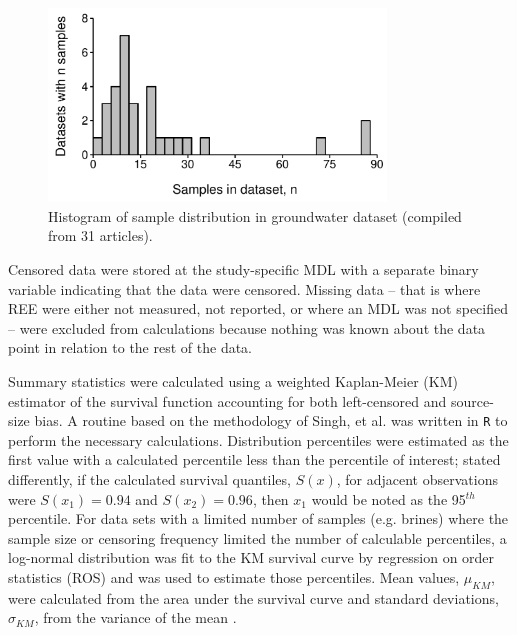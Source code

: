 \begin{figure}[htbp]
\begin{center}
\includegraphics[width=0.8\textwidth]{Ch3_figures/cite-n-dist.pdf}
\caption{Histogram of sample distribution in groundwater dataset (compiled from 31 articles).}\label{fig:sample_dist}
\end{center}
\end{figure}

Censored data were stored at the study-specific MDL with a separate binary variable indicating that the data were censored. Missing data -- that is where REE were either not measured, not reported, or where an MDL was not specified -- were excluded from calculations because nothing was known about the data point in relation to the rest of the data.

Summary statistics were calculated using a weighted Kaplan-Meier (KM) estimator of the survival function accounting for both left-censored and source-size bias.
A routine based on the methodology of Singh, et al. \citep{Singh_JAWMA_2013} was written in \texttt{R} \citep{R} to perform the necessary calculations.
Distribution percentiles were estimated as the first value with a calculated percentile less than the percentile of interest;
stated differently, if the calculated survival quantiles, $S(x)$, for adjacent observations were $S(x_1)=0.94$ and $S(x_2)=0.96$, then $x_1$ would be noted as the 95$^{th}$ percentile.
For data sets with a limited number of samples (e.g. brines) where the sample size or censoring frequency limited the number of calculable percentiles, a log-normal distribution was fit to the KM survival curve by regression on order statistics (ROS) and was used to estimate those percentiles.
Mean values, $\mu_{KM}$, were calculated from the area under the survival curve and standard deviations, $\sigma_{KM}$, from the variance of the mean \citep{Helsel_book}.

